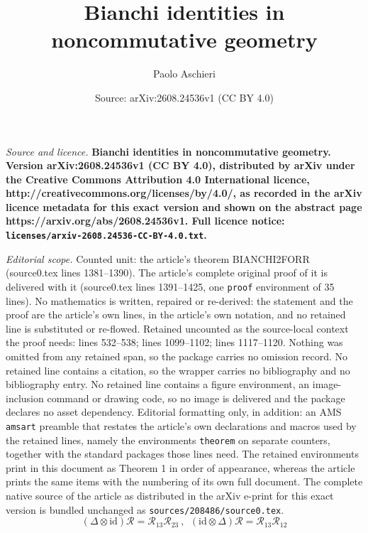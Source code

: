 \documentclass[10pt,a4paper]{amsart}
\title{\bf Bianchi identities in noncommutative geometry}
\author{Paolo Aschieri}
\date{Source: arXiv:2608.24536v1 (CC BY 4.0)}
\begin{document}
\maketitle

\noindent\emph{Source and licence.} \bf Bianchi identities in noncommutative geometry. Version arXiv:2608.24536v1 (CC BY 4.0), distributed by arXiv under the Creative Commons Attribution 4.0 International licence, http://creativecommons.org/licenses/by/4.0/, as recorded in the arXiv licence metadata for this exact version and shown on the abstract page https://arxiv.org/abs/2608.24536v1. Full licence notice: \texttt{licenses/arxiv-2608.24536-CC-BY-4.0.txt}.\par\smallskip

\noindent\textit{Editorial scope.} Counted unit: the article's theorem BIANCHI2FORR (source0.tex lines 1381--1390). The article's complete original proof of it is delivered with it (source0.tex lines 1391--1425, one \texttt{proof} environment of 35 lines). No mathematics is written, repaired or re-derived: the statement and the proof are the article's own lines, in the article's own notation, and no retained line is substituted or re-flowed.  Retained uncounted as the source-local context the proof needs: lines 532--538; lines 1099--1102; lines 1117--1120.  Nothing was omitted from any retained span, so the package carries no omission record.  No retained line contains a citation, so the wrapper carries no bibliography and no bibliography entry.  No retained line contains a figure environment, an image-inclusion command or drawing code, so no image is delivered and the package declares no asset dependency.  Editorial formatting only, in addition: an AMS \texttt{amsart} preamble that restates the article's own declarations and macros used by the retained lines, namely the environments \texttt{theorem} on separate counters, together with the standard packages those lines need.  The retained environments print in this document as Theorem 1 in order of appearance, whereas the article prints the same items with the numbering of its own full document.  The complete native source of the article as distributed in the arXiv e-print for this exact version is bundled unchanged as \texttt{sources/208486/source0.tex}.
\begin{equation}\label{hexagon}
    (\Delta\otimes\mathrm{id})\mathcal{R}
    =\mathcal{R}_{13}\mathcal{R}_{23}
   ~,~~
    (\mathrm{id}\otimes\Delta)\mathcal{R}
    =\mathcal{R}_{13}\mathcal{R}_{12}
  \end{equation}
\end{document}
